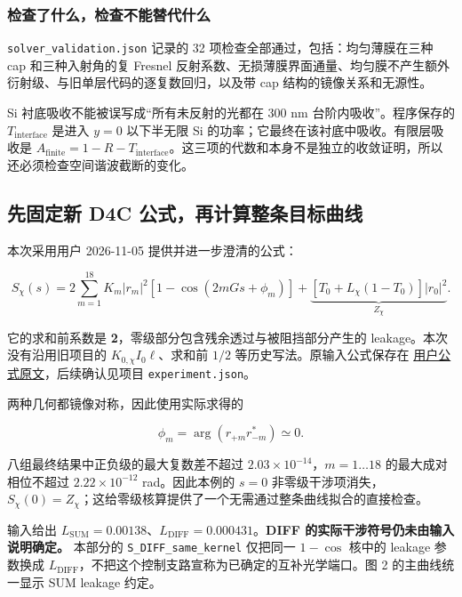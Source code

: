 \documentclass[
  chinese,
  UTF8,
  a4paper,
  11pt]{ctexart}
\begin{document}
\subsubsection{检查了什么，检查不能替代什么}\label{ux68c0ux67e5ux4e86ux4ec0ux4e48ux68c0ux67e5ux4e0dux80fdux66ffux4ee3ux4ec0ux4e48}

\texttt{solver\_validation.json} 记录的 32
项检查全部通过，包括：均匀薄膜在三种 cap 和三种入射角的复 Fresnel
反射系数、无损薄膜界面通量、均匀膜不产生额外衍射级、与旧单层代码的逐复数回归，以及带
cap 结构的镜像关系和无源性。

Si 衬底吸收不能被误写成``所有未反射的光都在 300 nm
台阶内吸收''。程序保存的 \(T_{\mathrm{interface}}\) 是进入 \(y=0\)
以下半无限 Si 的功率；它最终在该衬底中吸收。有限层吸收是
\(A_{\mathrm{finite}}=1-R-T_{\mathrm{interface}}\)。这三项的代数和本身不是独立的收敛证明，所以还必须检查空间谐波截断的变化。

\subsection{先固定新 D4C
公式，再计算整条目标曲线}\label{ux5148ux56faux5b9aux65b0-d4c-ux516cux5f0fux518dux8ba1ux7b97ux6574ux6761ux76eeux6807ux66f2ux7ebf}

本次采用用户 2026-11-05 提供并进一步澄清的公式：

\[
\boxed{
S_\chi(s)=2\sum_{m=1}^{18}K_m|r_m|^2
\left[1-\cos\left(2mGs+\phi_m\right)\right]
+\underbrace{\left[T_0+L_\chi(1-T_0)\right]|r_0|^2}_{Z_\chi}.
}
\]

它的求和前系数是 \textbf{2}，零级部分包含残余透过与被阻挡部分产生的
leakage。本次没有沿用旧项目的 \(K_{0,\chi}I_0\ell\)、求和前 \(1/2\)
等历史写法。原输入公式保存在
\href{../inputs/D4C_FDTD_user_formula_20261105.md}{用户公式原文}，后续确认见项目
\texttt{experiment.json}。

两种几何都镜像对称，因此使用实际求得的

\[
\phi_m=\arg(r_{+m}r_{-m}^*)\simeq0.
\]

八组最终结果中正负级的最大复数差不超过
\(2.03\times10^{-14}\)，\(m=1\ldots18\) 的最大成对相位不超过
\(2.22\times10^{-12}\) rad。因此本例的 \(s=0\)
非零级干涉项消失，\(S_\chi(0)=Z_\chi\)；这给零级核算提供了一个无需通过整条曲线拟合的直接检查。

输入给出
\(L_{\mathrm{SUM}}=0.00138\)、\(L_{\mathrm{DIFF}}=0.000431\)。\textbf{DIFF
的实际干涉符号仍未由输入说明确定。} 本部分的
\texttt{S\_DIFF\_same\_kernel} 仅把同一 \(1-\cos\) 核中的 leakage
参数换成
\(L_{\mathrm{DIFF}}\)，不把这个控制支路宣称为已确定的互补光学端口。图 2
的主曲线统一显示 SUM leakage 约定。
\end{document}
